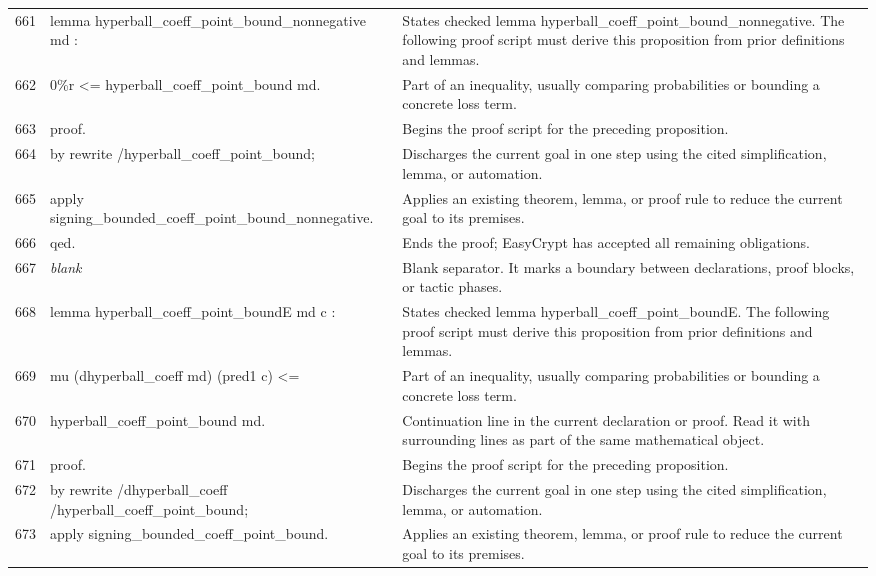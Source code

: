 \documentclass[10pt]{article}
\begin{document}
\begin{longtable}{r L{0.53\textwidth} L{0.37\textwidth}}
661 & {\ttfamily\scriptsize lemma hyperball\_coeff\_point\_bound\_nonnegative md :} & States checked lemma hyperball\_coeff\_point\_bound\_nonnegative.  The following proof script must derive this proposition from prior definitions and lemmas. \\
662 & {\ttfamily\scriptsize   0\%r <= hyperball\_coeff\_point\_bound md.} & Part of an inequality, usually comparing probabilities or bounding a concrete loss term. \\
663 & {\ttfamily\scriptsize proof.} & Begins the proof script for the preceding proposition. \\
664 & {\ttfamily\scriptsize by rewrite /hyperball\_coeff\_point\_bound;} & Discharges the current goal in one step using the cited simplification, lemma, or automation. \\
665 & {\ttfamily\scriptsize    apply signing\_bounded\_coeff\_point\_bound\_nonnegative.} & Applies an existing theorem, lemma, or proof rule to reduce the current goal to its premises. \\
666 & {\ttfamily\scriptsize qed.} & Ends the proof; EasyCrypt has accepted all remaining obligations. \\
667 & {\ttfamily\scriptsize \emph{blank}} & Blank separator.  It marks a boundary between declarations, proof blocks, or tactic phases. \\
668 & {\ttfamily\scriptsize lemma hyperball\_coeff\_point\_boundE md c :} & States checked lemma hyperball\_coeff\_point\_boundE.  The following proof script must derive this proposition from prior definitions and lemmas. \\
669 & {\ttfamily\scriptsize   mu (dhyperball\_coeff md) (pred1 c) <=} & Part of an inequality, usually comparing probabilities or bounding a concrete loss term. \\
670 & {\ttfamily\scriptsize   hyperball\_coeff\_point\_bound md.} & Continuation line in the current declaration or proof.  Read it with surrounding lines as part of the same mathematical object. \\
671 & {\ttfamily\scriptsize proof.} & Begins the proof script for the preceding proposition. \\
672 & {\ttfamily\scriptsize by rewrite /dhyperball\_coeff /hyperball\_coeff\_point\_bound;} & Discharges the current goal in one step using the cited simplification, lemma, or automation. \\
673 & {\ttfamily\scriptsize    apply signing\_bounded\_coeff\_point\_bound.} & Applies an existing theorem, lemma, or proof rule to reduce the current goal to its premises. \\

\end{longtable}
\end{document}
